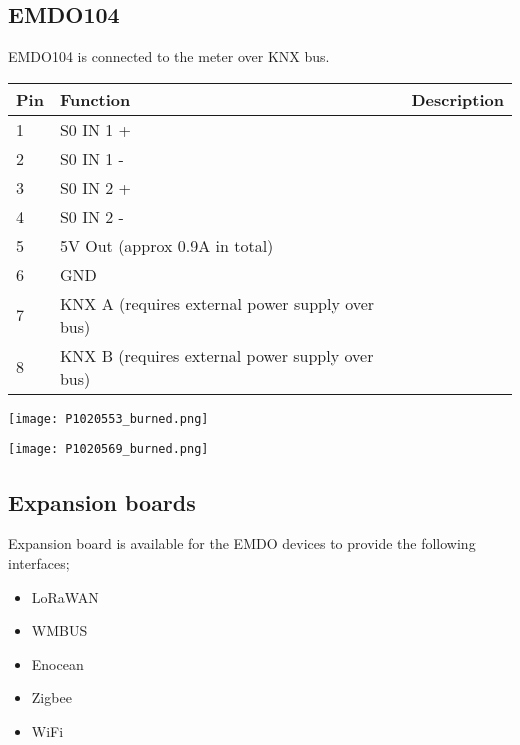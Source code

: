 \documentclass[11pt,fleqn]{book} %
\numberwithin{equation}{section} %
\numberwithin{figure}{section} %
\numberwithin{table}{section} %
\begin{document}
\subsection*{EMDO104}
EMDO104 is connected to the meter over KNX bus.

\begin{tabular}{@{}l l l @{}}\\\hline
Pin & Function & Description \\\hline
1 & S0 IN 1 + & \\
2 & S0 IN 1 - & \\
3 & S0 IN 2 + & \\
4 & S0 IN 2 - & \\
5 & 5V Out (approx 0.9A in total) & \\
6  & GND & \\
7  & KNX A (requires external power supply over bus) & \\
8  & KNX B (requires external power supply over bus) & \\\hline
\end{tabular}


\begin{center}
\texttt{[image: P1020553\_burned.png]}
\end{center}

\begin{center}
\texttt{[image: P1020569\_burned.png]}
\end{center}

\subsection*{Expansion boards}
Expansion board is available for the EMDO devices to provide the following interfaces;

\begin{itemize}
\item LoRaWAN
\item WMBUS
\item Enocean
\item Zigbee
\item WiFi
\end{itemize}


\end{document}
